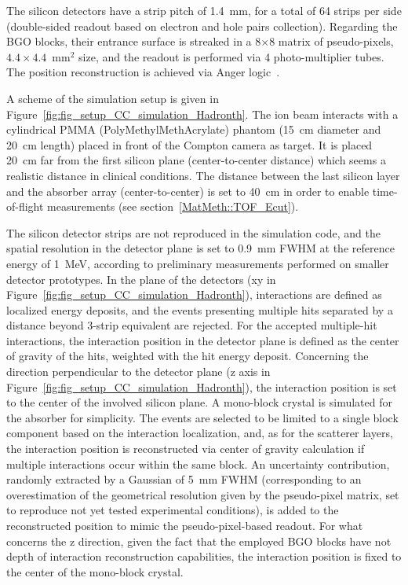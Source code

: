The silicon detectors have a strip pitch of 1.4~mm, for a total of 64 strips per side (double-sided readout based on electron and hole pairs collection). 
Regarding the BGO blocks, their entrance surface is streaked in a 8$\times$8 matrix of pseudo-pixels, $4.4\times4.4$~mm$^{2}$ size, and the readout is performed via 4 photo-multiplier tubes. The position reconstruction is achieved via Anger logic~\cite{Fontana2018}.

A scheme of the simulation setup is given in Figure~\ref{fig:fig_setup_CC_simulation_Hadronth}. The ion beam interacts with a cylindrical PMMA (PolyMethylMethAcrylate) phantom (15~cm diameter and 20~cm length) placed in front of the Compton camera as target. It is placed 20~cm far from the first silicon plane (center-to-center distance) which seems a realistic distance in clinical conditions. The distance between the last silicon layer and the absorber array (center-to-center) is set to 40~cm in order to enable time-of-flight measurements (see section~\ref{MatMeth::TOF_Ecut}).

The silicon detector strips are not reproduced in the simulation code, and the spatial resolution in the detector plane is set to 0.9~mm FWHM at the reference energy of 1~MeV, according to preliminary measurements performed on smaller detector prototypes. In the plane of the detectors (xy in Figure~\ref{fig:fig_setup_CC_simulation_Hadronth}), interactions are defined as localized energy deposits, and the events presenting multiple hits separated by a distance beyond 3-strip equivalent are rejected. For the accepted multiple-hit interactions, the interaction position in the detector plane is defined as the center of gravity of the hits, weighted with the hit energy deposit. Concerning the direction perpendicular to the detector plane (z axis in Figure~\ref{fig:fig_setup_CC_simulation_Hadronth}), the interaction position is set to the center of the involved silicon plane. A mono-block crystal is simulated for the absorber for simplicity. The events are selected to be limited to a single block component based on the interaction localization, and, as for the scatterer layers, the interaction position is reconstructed via center of gravity calculation if multiple interactions occur within the same block. An uncertainty contribution, randomly extracted by a Gaussian of 5~mm FWHM (corresponding to an overestimation of the geometrical resolution given by the pseudo-pixel matrix, set to reproduce not yet tested experimental conditions), is added to the reconstructed position to mimic the pseudo-pixel-based readout. For what concerns the z direction, given the fact that the employed BGO blocks have not depth of interaction reconstruction capabilities, the interaction position is fixed to the center of the mono-block crystal.

